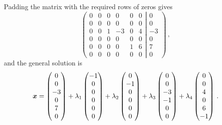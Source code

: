 Padding the matrix with the required rows of zeros gives
\begin{equation*}
  \left(
  \begin{matrix}
  0 & 0 & 0 & 0 & 0 & 0 \\
  0 & 0 & 0 & 0 & 0 & 0 \\
  0 & 0 & 1 & -3 & 0 & 4\\
  0 & 0 & 0 & 0 & 0 & 0 \\
  0 & 0 & 0 & 0 & 1 & 6 \\
  0 & 0 & 0 & 0 & 0 & 0   
  \end{matrix}
  \right.\left|\left.
  \begin{matrix}
  0 \\ 0 \\ -3 \\ 0 \\ 7 \\ 0
  \end{matrix}
  \right)\right.\,,
\end{equation*}
and the general solution is
\begin{equation*}
  \boldsymbol{x} =
  \begin{pmatrix}
  0 \\ 0 \\ -3 \\ 0 \\ 7 \\ 0
  \end{pmatrix}
  + \lambda_1
  \begin{pmatrix}
  -1 \\ 0 \\ 0 \\ 0 \\ 0 \\ 0
  \end{pmatrix}
  + \lambda_2
  \begin{pmatrix}
  0 \\ -1 \\ 0 \\ 0 \\ 0 \\ 0 
  \end{pmatrix}
  + \lambda_3
  \begin{pmatrix}
  0 \\ 0 \\ -3 \\ -1 \\ 0 \\ 0 
  \end{pmatrix}
  + \lambda_4
  \begin{pmatrix}
  0 \\ 0 \\ 4 \\ 0 \\ 6 \\ -1
  \end{pmatrix}  \,.
\end{equation*}


